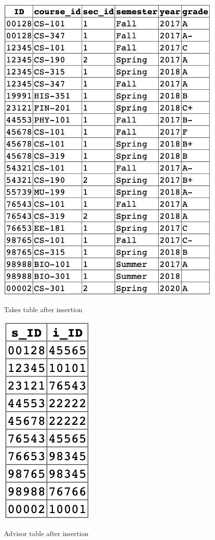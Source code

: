 \documentclass[12pt]{article}
\begin{document}
\begin{figure}[!hbt]
    \centering
    \includegraphics[scale=1.3]{screenshots/takes.png}
    \label{fig:my_label1}
    \caption{Takes table after insertion}
\end{figure}
\newpage

\begin{figure}[!hbt]
    \centering
    \includegraphics[scale=0.9]{screenshots/advisor.png}
    \label{fig:my_label1}
    \caption{Advisor table after insertion}
\end{figure}
\end{document}
